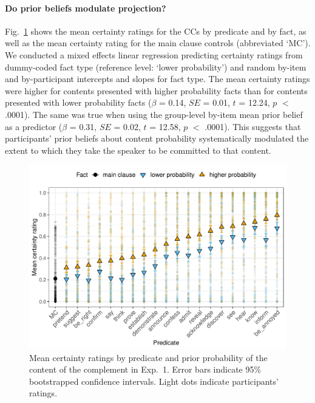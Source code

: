 \documentclass[11pt,fleqn]{article}
\newcommand{\figref}[1]{Fig.~\ref{#1}}
\newcommand{\6}{\mbox{$[\hspace*{-.6mm}[$}}
\newcommand{\9}{\mbox{$]\hspace*{-.6mm}]$}}
\begin{document}
\paragraph{Do prior beliefs modulate projection?}  \figref{f-projection-mean} shows the mean certainty ratings for the CCs by  predicate and by fact, as well as the mean certainty rating for the main clause controls (abbreviated `MC'). We conducted a mixed effects linear regression predicting certainty ratings from dummy-coded fact type (reference level: `lower probability') and random by-item and by-participant intercepts and slopes for fact type. The mean certainty ratings were higher for contents  presented with higher probability facts than for contents presented with lower probability facts ($\beta$ = 0.14, $SE$ = 0.01, $t$ = 12.24, $p$ $<$ .0001).   The same was true when using the group-level by-item mean prior belief as a predictor  ($\beta$ = 0.31, $SE$ = 0.02, $t$ = 12.58, $p$ $<$ .0001).   This %
suggests that participants' prior beliefs about content probability systematically modulated the extent to which they take the speaker to be committed to that content.

\begin{figure}[h!]
\centering

\includegraphics[width=.7\paperwidth]{../../results/9-prior-projection/graphs/means-projectivity-by-predicate-and-prior}

\caption{Mean certainty ratings by predicate and prior probability of the content of the complement in Exp.~1. Error bars indicate 95\% bootstrapped confidence intervals. Light dots indicate participants' ratings.} 
\label{f-projection-mean}
\end{figure}
\end{document}
